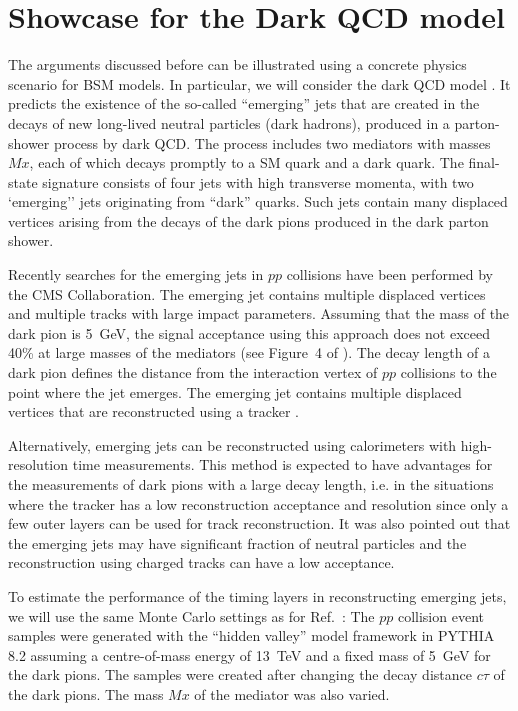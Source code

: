 \section{Showcase for the Dark QCD model}
\label{darksec}

The arguments discussed before can be illustrated using a concrete physics scenario for BSM models.
In particular, we will consider the dark QCD model \cite{Bai:2013xga,Schwaller:2015gea}. It predicts 
the existence of the so-called ``emerging'' jets 
that are created in the decays of new long-lived neutral 
particles (dark hadrons), produced in a parton-shower process by dark QCD.
The process includes  two mediators with masses $Mx$, each of which 
decays promptly to a SM quark and a dark quark. 
The final-state signature consists of four jets with high transverse momenta, with two  
`emerging'' jets originating from ``dark'' quarks.  Such jets  contain many displaced
vertices arising from the decays of the dark pions produced in the dark parton shower.

Recently searches for the  emerging jets in $pp$ collisions have been performed \cite{Sirunyan:2018njd} 
by the CMS Collaboration.
The emerging jet contains multiple displaced vertices and multiple 
tracks with large impact parameters. Assuming that the mass of the dark pion is 5~GeV, 
the signal acceptance using this approach does not exceed 40\% at large masses of the mediators
(see Figure~4 of \cite{Sirunyan:2018njd}).
The decay length of a dark pion defines the distance from the interaction vertex of $pp$ collisions 
to the point where the jet emerges. The  emerging jet contains multiple displaced vertices
that are reconstructed using a tracker  \cite{Sirunyan:2018njd}.

Alternatively, emerging jets can be reconstructed using calorimeters with high-resolution time measurements. This method is expected
to have advantages for the measurements of dark pions with a large decay length, i.e. in the situations where the tracker has a low
reconstruction acceptance and resolution since only a few outer layers can be used for track reconstruction.
It was also pointed out \cite{Schwaller:2015gea} that the emerging jets may have significant fraction of neutral particles and the reconstruction
using charged tracks can have a low acceptance.

To estimate the performance of the timing layers in reconstructing emerging jets,
we will use the same Monte Carlo settings as for Ref.~\cite{Sirunyan:2018njd}:
The $pp$ collision event samples  were  generated with the ``hidden valley'' model framework in PYTHIA 8.2 assuming a centre-of-mass energy of 13~TeV and  
a fixed mass of 5~GeV for the dark pions. The samples were created after changing the decay distance $c\tau$ of the dark pions.  
The  mass $Mx$ of the mediator was also varied. 

